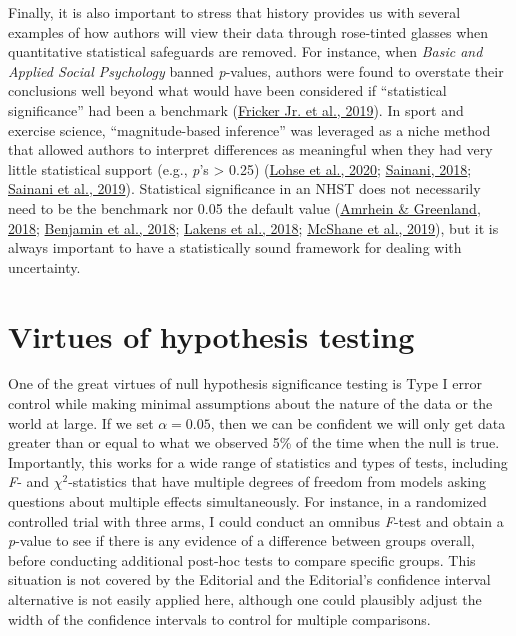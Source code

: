 \documentclass[]{cik}%
\begin{document}
Finally, it is also important to stress that history provides us with
several examples of how authors will view their data through rose-tinted
glasses when quantitative statistical safeguards are removed. For
instance, when \emph{Basic and Applied Social Psychology} banned
\emph{p}-values, authors were found to overstate their conclusions well
beyond what would have been considered if ``statistical significance''
had been a benchmark (\protect\hyperlink{ref-26}{Fricker Jr. et al.,
2019}). In sport and exercise science, ``magnitude-based inference'' was
leveraged as a niche method that allowed authors to interpret
differences as meaningful when they had very little statistical support
(e.g., \emph{p}'s \textgreater{} 0.25) (\protect\hyperlink{ref-29}{Lohse
et al., 2020}; \protect\hyperlink{ref-27}{Sainani, 2018};
\protect\hyperlink{ref-28}{Sainani et al., 2019}). Statistical
significance in an NHST does not necessarily need to be the benchmark
nor 0.05 the default value (\protect\hyperlink{ref-32}{Amrhein \&
Greenland, 2018}; \protect\hyperlink{ref-30}{Benjamin et al., 2018};
\protect\hyperlink{ref-31}{Lakens et al., 2018};
\protect\hyperlink{ref-33}{McShane et al., 2019}), but it is always
important to have a statistically sound framework for dealing with
uncertainty.

\hypertarget{virtues-of-hypothesis-testing}{%
\section{Virtues of hypothesis
testing}\label{virtues-of-hypothesis-testing}}

One of the great virtues of null hypothesis significance testing is Type
I error control while making minimal assumptions about the nature of the
data or the world at large. If we set \(\alpha = 0.05\), then we can be
confident we will only get data greater than or equal to what we
observed 5\% of the time when the null is true. Importantly, this works
for a wide range of statistics and types of tests, including \emph{F}-
and \(\chi^2\)-statistics that have multiple degrees of freedom from
models asking questions about multiple effects simultaneously. For
instance, in a randomized controlled trial with three arms, I could
conduct an omnibus \emph{F}-test and obtain a \emph{p}-value to see if
there is any evidence of a difference between groups overall, before
conducting additional post-hoc tests to compare specific groups. This
situation is not covered by the Editorial and the Editorial's confidence
interval alternative is not easily applied here, although one could
plausibly adjust the width of the confidence intervals to control for
multiple comparisons.
\end{document}
